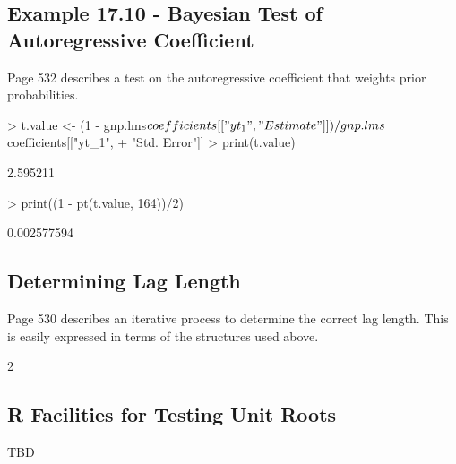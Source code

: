 \subsection{Example 17.10 - Bayesian Test of Autoregressive Coefficient}
Page 532 describes a test on the autoregressive coefficient that weights prior probabilities.
\begin{Schunk}
\begin{Sinput}
> t.value <- (1 - gnp.lms$coefficients[["yt_1", "Estimate"]])/gnp.lms$coefficients[["yt_1", 
+     "Std. Error"]]
> print(t.value)
\end{Sinput}
\begin{Soutput}
[1] 2.595211
\end{Soutput}
\begin{Sinput}
> print((1 - pt(t.value, 164))/2)
\end{Sinput}
\begin{Soutput}
[1] 0.002577594
\end{Soutput}
\end{Schunk}
\subsection{Determining Lag Length}
Page 530 describes an iterative process to determine the correct lag length.  This is easily expressed
in terms of the structures used above.
\begin{Schunk}
\begin{Soutput}
[1] 2
\end{Soutput}
\end{Schunk}
\subsection{R Facilities for Testing Unit Roots}
TBD


